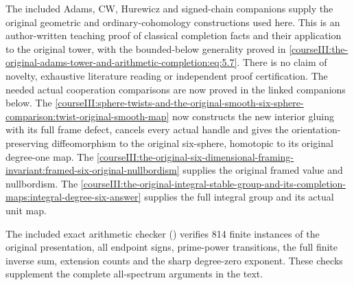The included Adams, CW, Hurewicz and signed-chain companions supply the original geometric and ordinary-cohomology constructions used here. This is an author-written teaching proof of classical completion facts and their application to the original tower, with the bounded-below generality proved in \eqref{courseIII:the-original-adams-tower-and-arithmetic-completion:eq:5.7}. There is no claim of novelty, exhaustive literature reading or independent proof certification. The needed actual cooperation comparisons are now proved in the linked companions below. The \cref{courseIII:sphere-twists-and-the-original-smooth-six-sphere-comparison:twist-original-smooth-map} now constructs the new interior gluing with its full frame defect, cancels every actual handle and gives the orientation-preserving diffeomorphism to the original six-sphere, homotopic to its original degree-one map. The \cref{courseIII:the-original-six-dimensional-framing-invariant:framed-six-original-nullbordism} supplies the original framed value and nullbordism. The \cref{courseIII:the-original-integral-stable-group-and-its-completion-maps:integral-degree-six-answer} supplies the full integral group and its actual unit map.

The included exact arithmetic checker () verifies 814 finite instances of the original presentation, all endpoint signs, prime-power transitions, the full finite inverse sum, extension counts and the sharp degree-zero exponent. These checks supplement the complete all-spectrum arguments in the text.

